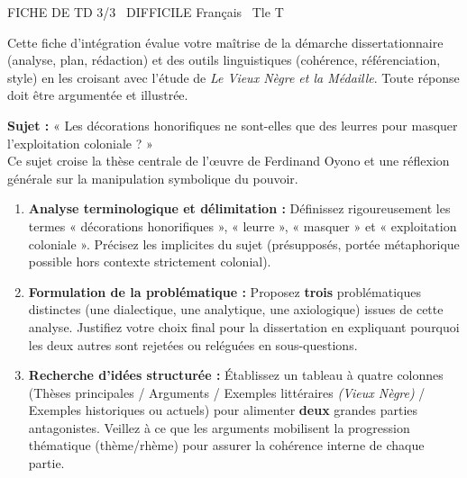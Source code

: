\documentclass[11pt]{article}
\begin{document}
\begin{tcolorbox}[enhanced,colback=popink,colframe=popink,arc=10pt,boxrule=0pt,left=12pt,right=12pt,top=9pt,bottom=9pt]
{\color{white}\popxbold\small FICHE DE TD 3/3 \textbullet\ DIFFICILE \hfill Français \textbullet\ Tle T\par}
\end{tcolorbox}
\vspace{4pt}
\noindent Cette fiche d'intégration évalue votre maîtrise de la démarche dissertationnaire (analyse, plan, rédaction) et des outils linguistiques (cohérence, référenciation, style) en les croisant avec l'étude de \textit{Le Vieux Nègre et la Médaille}. Toute réponse doit être argumentée et illustrée.

\begin{exercice}
\textbf{Sujet :} « Les décorations honorifiques ne sont-elles que des leurres pour masquer l'exploitation coloniale ? »\\
Ce sujet croise la thèse centrale de l'œuvre de Ferdinand Oyono et une réflexion générale sur la manipulation symbolique du pouvoir.

\begin{enumerate}
    \item \textbf{Analyse terminologique et délimitation :} Définissez rigoureusement les termes « décorations honorifiques », « leurre », « masquer » et « exploitation coloniale ». Précisez les implicites du sujet (présupposés, portée métaphorique possible hors contexte strictement colonial).
    \item \textbf{Formulation de la problématique :} Proposez \textbf{trois} problématiques distinctes (une dialectique, une analytique, une axiologique) issues de cette analyse. Justifiez votre choix final pour la dissertation en expliquant pourquoi les deux autres sont rejetées ou reléguées en sous-questions.
    \item \textbf{Recherche d'idées structurée :} Établissez un tableau à quatre colonnes (Thèses principales / Arguments / Exemples littéraires \textit{(Vieux Nègre)} / Exemples historiques ou actuels) pour alimenter \textbf{deux} grandes parties antagonistes. Veillez à ce que les arguments mobilisent la progression thématique (thème/rhème) pour assurer la cohérence interne de chaque partie.
\end{enumerate}
\end{exercice}
\end{document}
